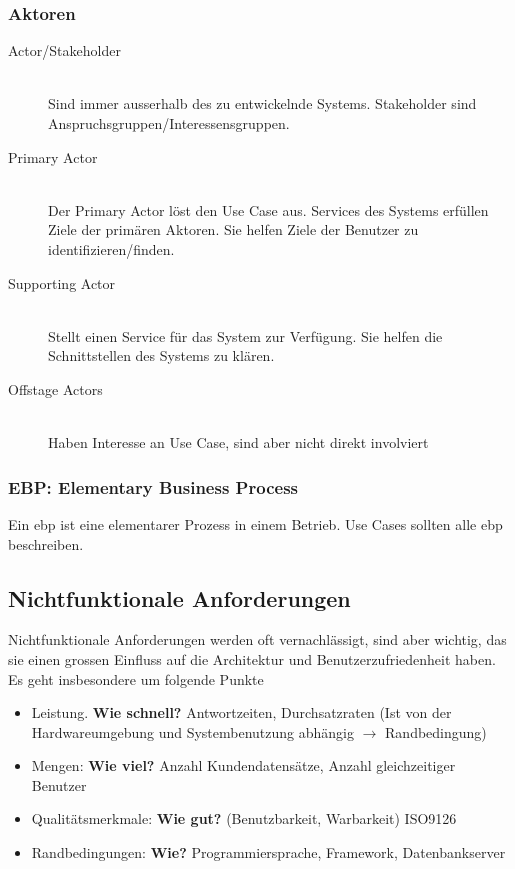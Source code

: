 \subsubsection{Aktoren}
\begin{description}
	\item[Actor/Stakeholder]  \hfill \\
	Sind immer ausserhalb des zu entwickelnde Systems. Stakeholder sind Anspruchsgruppen/Interessensgruppen.
	\item[Primary Actor]  \hfill \\
	Der Primary Actor löst den Use Case aus. Services des Systems erfüllen Ziele der primären Aktoren. Sie helfen Ziele der Benutzer zu identifizieren/finden.
	\item[Supporting Actor] \hfill \\
	Stellt einen Service für das System zur Verfügung. Sie helfen die Schnittstellen des Systems zu klären.
	\item[Offstage Actors] \hfill \\
	Haben Interesse an Use Case, sind aber nicht direkt involviert
\end{description}

\subsubsection{EBP: Elementary Business Process}
Ein \gls{ebp} ist eine elementarer Prozess in einem Betrieb. Use Cases sollten alle \gls{ebp} beschreiben. 

\subsection{Nichtfunktionale Anforderungen}
Nichtfunktionale Anforderungen werden oft vernachlässigt, sind aber wichtig, das sie einen grossen Einfluss auf die Architektur und Benutzerzufriedenheit haben. Es geht insbesondere um folgende Punkte
\begin{itemize}
	\item Leistung. \textbf{Wie schnell?} Antwortzeiten, Durchsatzraten (Ist von der Hardwareumgebung und Systembenutzung abhängig $\rightarrow$ Randbedingung)
	\item Mengen: \textbf{Wie viel?} Anzahl Kundendatensätze, Anzahl gleichzeitiger Benutzer
	\item Qualitätsmerkmale: \textbf{Wie gut?} (Benutzbarkeit, Warbarkeit)  ISO9126
	\item Randbedingungen: \textbf{Wie?} Programmiersprache, Framework, Datenbankserver
\end{itemize}

